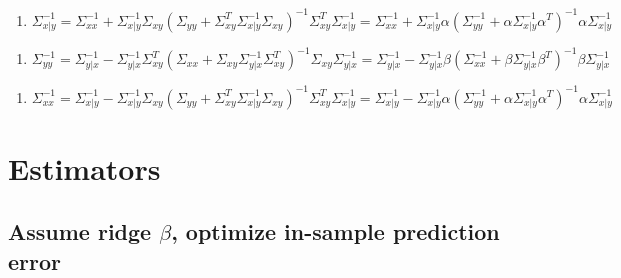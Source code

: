 \documentclass[11pt,]{book}
\providecommand{\tightlist}{%
  \setlength{\itemsep}{0pt}\setlength{\parskip}{0pt}}
\theoremstyle{definition}
\theoremstyle{definition}
\theoremstyle{definition}
\theoremstyle{remark}
\begin{document}
\vspace{0.5cm}

\begin{enumerate}
\def\labelenumi{\arabic{enumi}.}
\setcounter{enumi}{5}
\tightlist
\item
  \(\Sigma_{x | y}^{-1} = \Sigma_{xx}^{-1} + \Sigma_{x | y}^{-1}\Sigma_{xy}\left( \Sigma_{yy} + \Sigma_{xy}^{T}\Sigma_{x | y}^{-1}\Sigma_{xy} \right)^{-1}\Sigma_{xy}^{T}\Sigma_{x | y}^{-1} = \Sigma_{xx}^{-1} + \Sigma_{x | y}^{-1}\alpha\left( \Sigma_{yy}^{-1} + \alpha\Sigma_{x | y}^{-1}\alpha^{T} \right)^{-1}\alpha\Sigma_{x | y}^{-1}\)
\end{enumerate}

\vspace{0.5cm}

\begin{enumerate}
\def\labelenumi{\arabic{enumi}.}
\setcounter{enumi}{6}
\tightlist
\item
  \(\Sigma_{yy}^{-1} = \Sigma_{y | x}^{-1} - \Sigma_{y | x}^{-1}\Sigma_{xy}^{T}\left( \Sigma_{xx} + \Sigma_{xy}\Sigma_{y | x}^{-1}\Sigma_{xy}^{T} \right)^{-1}\Sigma_{xy}\Sigma_{y | x}^{-1} = \Sigma_{y | x}^{-1} - \Sigma_{y | x}^{-1}\beta\left( \Sigma_{xx}^{-1} + \beta\Sigma_{y | x}^{-1}\beta^{T} \right)^{-1}\beta\Sigma_{y | x}^{-1}\)
\end{enumerate}

\vspace{0.5cm}

\begin{enumerate}
\def\labelenumi{\arabic{enumi}.}
\setcounter{enumi}{7}
\tightlist
\item
  \(\Sigma_{xx}^{-1} = \Sigma_{x | y}^{-1} - \Sigma_{x | y}^{-1}\Sigma_{xy}\left( \Sigma_{yy} + \Sigma_{xy}^{T}\Sigma_{x | y}^{-1}\Sigma_{xy} \right)^{-1}\Sigma_{xy}^{T}\Sigma_{x | y}^{-1} = \Sigma_{x | y}^{-1} - \Sigma_{x | y}^{-1}\alpha\left( \Sigma_{yy}^{-1} + \alpha\Sigma_{x | y}^{-1}\alpha^{T} \right)^{-1}\alpha\Sigma_{x | y}^{-1}\)
\end{enumerate}

\newpage

\hypertarget{estimators}{%
\section{Estimators}\label{estimators}}

\hypertarget{assume-ridge-beta-optimize-in-sample-prediction-error}{%
\subsection{\texorpdfstring{Assume ridge \(\beta\), optimize in-sample
prediction
error}{Assume ridge \textbackslash{}beta, optimize in-sample prediction error}}\label{assume-ridge-beta-optimize-in-sample-prediction-error}}
\end{document}
